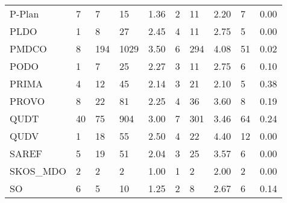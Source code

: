 \begin{tabular}{llllllllll}
P-Plan                      &                          7 &                          7 &              15 &           1.36 &              2 &                11 &             2.20 &                7 &         0.00 \\
PLDO                        &                          1 &                          8 &              27 &           2.45 &              4 &                11 &             2.75 &                5 &         0.00 \\
PMDCO                       &                          8 &                        194 &            1029 &           3.50 &              6 &               294 &             4.08 &               51 &         0.02 \\
PODO                        &                          1 &                          7 &              25 &           2.27 &              3 &                11 &             2.75 &                6 &         0.10 \\
PRIMA                       &                          4 &                         12 &              45 &           2.14 &              3 &                21 &             2.10 &                5 &         0.38 \\
PROVO                       &                          8 &                         22 &              81 &           2.25 &              4 &                36 &             3.60 &                8 &         0.19 \\
QUDT                        &                         40 &                         75 &             904 &           3.00 &              7 &               301 &             3.46 &               64 &         0.24 \\
QUDV                        &                          1 &                         18 &              55 &           2.50 &              4 &                22 &             4.40 &               12 &         0.00 \\
SAREF                       &                          5 &                         19 &              51 &           2.04 &              3 &                25 &             3.57 &                6 &         0.00 \\
SKOS\_MDO                    &                          2 &                          2 &               2 &           1.00 &              1 &                 2 &             2.00 &                2 &         0.00 \\
SO                          &                          6 &                          5 &              10 &           1.25 &              2 &                 8 &             2.67 &                6 &         0.14 \\

\end{tabular}
